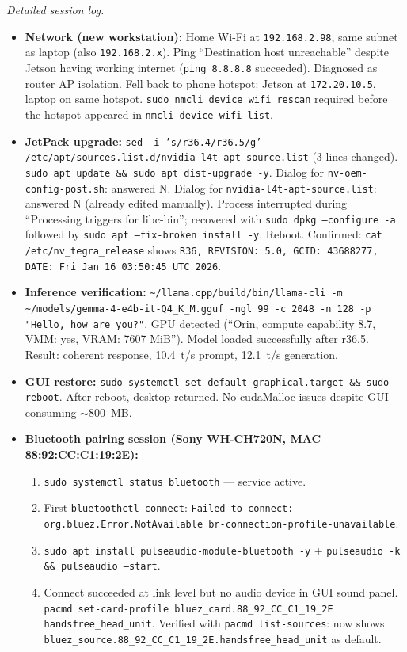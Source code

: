 \documentclass{article}
\theoremstyle{plain}
\theoremstyle{definition}
\theoremstyle{remark}
\begin{document}
\textit{Detailed session log.}
\begin{itemize}
\item \textbf{Network (new workstation):} Home Wi-Fi at \texttt{192.168.2.98}, same subnet as laptop (also \texttt{192.168.2.x}). Ping ``Destination host unreachable'' despite Jetson having working internet (\texttt{ping 8.8.8.8} succeeded). Diagnosed as router AP isolation. Fell back to phone hotspot: Jetson at \texttt{172.20.10.5}, laptop on same hotspot. \texttt{sudo nmcli device wifi rescan} required before the hotspot appeared in \texttt{nmcli device wifi list}.
\item \textbf{JetPack upgrade:} \texttt{sed -i 's/r36.4/r36.5/g' /etc/apt/sources.list.d/nvidia-l4t-apt-source.list} (3 lines changed). \texttt{sudo apt update \&\& sudo apt dist-upgrade -y}. Dialog for \texttt{nv-oem-config-post.sh}: answered N. Dialog for \texttt{nvidia-l4t-apt-source.list}: answered N (already edited manually). Process interrupted during ``Processing triggers for libc-bin''; recovered with \texttt{sudo dpkg --configure -a} followed by \texttt{sudo apt --fix-broken install -y}. Reboot. Confirmed: \texttt{cat /etc/nv\_tegra\_release} shows \texttt{R36, REVISION: 5.0, GCID: 43688277, DATE: Fri Jan 16 03:50:45 UTC 2026}.
\item \textbf{Inference verification:} \texttt{\~{}/llama.cpp/build/bin/llama-cli -m \~{}/models/gemma-4-e4b-it-Q4\_K\_M.gguf -ngl 99 -c 2048 -n 128 -p "Hello, how are you?"}. GPU detected (``Orin, compute capability 8.7, VMM: yes, VRAM: 7607 MiB''). Model loaded successfully after r36.5. Result: coherent response, 10.4~t/s prompt, 12.1~t/s generation.
\item \textbf{GUI restore:} \texttt{sudo systemctl set-default graphical.target \&\& sudo reboot}. After reboot, desktop returned. No cudaMalloc issues despite GUI consuming $\sim$800~MB.
\item \textbf{Bluetooth pairing session (Sony WH-CH720N, MAC 88:92:CC:C1:19:2E):}
  \begin{enumerate}
  \item \texttt{sudo systemctl status bluetooth} --- service active.
  \item First \texttt{bluetoothctl connect}: \texttt{Failed to connect: org.bluez.Error.NotAvailable br-connection-profile-unavailable}.
  \item \texttt{sudo apt install pulseaudio-module-bluetooth -y} + \texttt{pulseaudio -k \&\& pulseaudio --start}.
  \item Connect succeeded at link level but no audio device in GUI sound panel. \texttt{pacmd set-card-profile bluez\_card.88\_92\_CC\_C1\_19\_2E handsfree\_head\_unit}. Verified with \texttt{pacmd list-sources}: now shows \texttt{bluez\_source.88\_92\_CC\_C1\_19\_2E.handsfree\_head\_unit} as default.

\end{enumerate}
\end{itemize}
\end{document}
